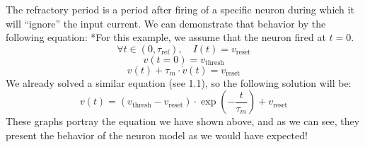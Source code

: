 The refractory period is a period after firing of a specific neuron during which it will ``ignore'' the input current. We can demonstrate that behavior by the following equation:
*For this example, we assume that the neuron fired at \( t=0 \).
\begin{equation}
\forall t \in (0,\tau_{\text{ref}}), \quad I(t) = v_{\text{reset}}
\end{equation}
\begin{equation}
v(t=0) = v_{\text{thresh}}
\end{equation}
\begin{equation}
v(t) + \tau_m \cdot \dot{v}(t) = v_{\text{reset}}
\end{equation}
We already solved a similar equation (see 1.1), so the following solution will be:
\begin{equation}
v(t) = (v_{\text{thresh}} - v_{\text{reset}}) \cdot \exp\left(-\frac{t}{\tau_m}\right) + v_{\text{reset}}
\end{equation}
These graphs portray the equation we have shown above, and as we can see, they present the behavior of the neuron model as we would have expected!

